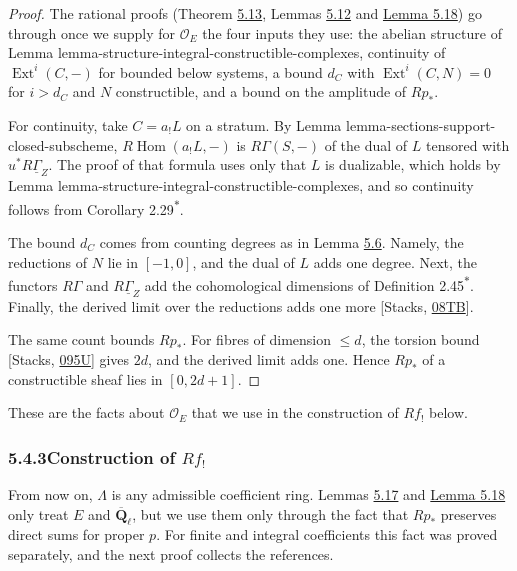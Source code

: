 \documentclass[11pt]{article}
\newcommand{\bpout}[1]{#1\textsuperscript{\hyperlink{bp-outside}{\ensuremath{\ast}}}}
\providecommand{\Ext}{}\renewcommand{\Ext}{\operatorname{Ext}}
\begin{document}
\begin{proof}[{Proof}]\label{bp72}%
The rational proofs (Theorem \hyperref[bp40]{5.13}, Lemmas \hyperref[bp37]{5.12} and \hyperref[bp61]{Lemma 5.18}) go through once we supply for \(\mathcal O_E\) the four inputs they use: the abelian structure of Lemma lemma-structure-integral-constructible-complexes, continuity of \(\Ext^i(C,-)\) for bounded below systems, a bound \(d_C\) with \(\Ext^i(C,N)=0\) for \(i>d_C\) and \(N\) constructible, and a bound on the amplitude of \(Rp_*\).

For continuity, take \(C=a_!L\) on a stratum. By Lemma lemma-sections-support-closed-subscheme, \(R\!\operatorname{Hom}(a_!L,-)\) is \(R\Gamma(S,-)\) of the dual of \(L\) tensored with \(u^*R\underline\Gamma_Z\). The proof of that formula uses only that \(L\) is dualizable, which holds by Lemma lemma-structure-integral-constructible-complexes, and so continuity follows from Corollary \bpout{2.29}.

The bound \(d_C\) comes from counting degrees as in Lemma \hyperref[bp20]{5.6}. Namely, the reductions of \(N\) lie in \([-1,0]\), and the dual of \(L\) adds one degree. Next, the functors \(R\Gamma\) and \(R\underline\Gamma_Z\) add the cohomological dimensions of Definition \bpout{2.45}. Finally, the derived limit over the reductions adds one more [Stacks, \href{https://stacks.math.columbia.edu/tag/08TB}{08TB}].

The same count bounds \(Rp_*\). For fibres of dimension \(\le d\), the torsion bound [Stacks, \href{https://stacks.math.columbia.edu/tag/095U}{095U}] gives \(2d\), and the derived limit adds one. Hence \(Rp_*\) of a constructible sheaf lies in \([0,2d+1]\).
\end{proof}

\label{bp73}%
These are the facts about \(\mathcal O_E\) that we use in the construction of \(Rf_!\) below.


\subsubsection*{\texorpdfstring{5.4.3\quad Construction of $Rf_!$}{5.4.3 Construction of Rf!}}
\label{bp74}%
\label{bp75}%
From now on, \(\Lambda\) is any admissible coefficient ring. Lemmas \hyperref[bp57]{5.17} and \hyperref[bp61]{Lemma 5.18} only treat \(E\) and \(\overline{\mathbf Q}_\ell\), but we use them only through the fact that \(Rp_*\) preserves direct sums for proper \(p\). For finite and integral coefficients this fact was proved separately, and the next proof collects the references.
\end{document}
